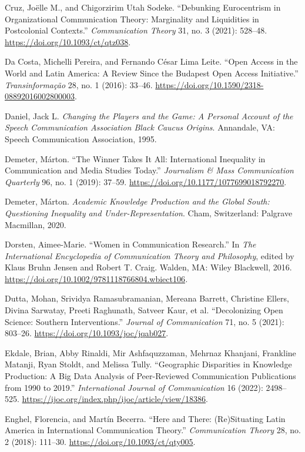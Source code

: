 \documentclass{tufte-handout}
\begin{document}
\begin{hangparas}{.25in}{1}
Cruz, Joëlle M., and Chigorzirim Utah Sodeke. ``Debunking Eurocentrism
in Organizational Communication Theory: Marginality and Liquidities in
Postcolonial Contexts.'' \emph{Communication Theory} 31, no. 3 (2021):
528--48. \url{https://doi.org/10.1093/ct/qtz038}.

Da Costa, Michelli Pereira, and Fernando César Lima Leite. ``Open Access
in the World and Latin America: A Review Since the Budapest Open Access
Initiative.'' \emph{Transinformação} 28, no. 1 (2016): 33--46.
\url{https://doi.org/10.1590/2318-08892016002800003}.

Daniel, Jack L. \emph{Changing the Players and the Game: A Personal
Account of the Speech Communication Association Black Caucus Origins}.
Annandale, VA: Speech Communication Association, 1995.

Demeter, Márton. ``The Winner Takes It All: International Inequality in
Communication and Media Studies Today.'' \emph{Journalism \& Mass
Communication Quarterly} 96, no. 1 (2019): 37--59.
\url{https://doi.org/10.1177/1077699018792270}.

Demeter, Márton. \emph{Academic Knowledge Production and the Global
South: Questioning Inequality and Under-Representation}. Cham,
Switzerland: Palgrave Macmillan, 2020.

Dorsten, Aimee-Marie. ``Women in Communication Research.'' In \emph{The
International Encyclopedia of Communication Theory and Philosophy},
edited by Klaus Bruhn Jensen and Robert T. Craig. Walden, MA: Wiley
Blackwell, 2016.
\url{https://doi.org/10.1002/9781118766804.wbiect106}\emph{.}

Dutta, Mohan, Srividya Ramasubramanian, Mereana Barrett, Christine
Ellers, Divina Sarwatay, Preeti Raghunath, Satveer Kaur, et al.
``Decolonizing Open Science: Southern Interventions.'' \emph{Journal of
Communication} 71, no. 5 (2021): 803--26.
\url{https://doi.org/10.1093/joc/jqab027}.

Ekdale, Brian, Abby Rinaldi, Mir Ashfaquzzaman, Mehrnaz Khanjani,
Frankline Matanji, Ryan Stoldt, and Melissa Tully. ``Geographic
Disparities in Knowledge Production: A Big Data Analysis of
Peer-Reviewed Communication Publications from 1990 to 2019.''
\emph{International Journal of Communication} 16 (2022): 2498--525.
\url{https://ijoc.org/index.php/ijoc/article/view/18386}.

Enghel, Florencia, and Martín Becerra. ``Here and There: (Re)Situating
Latin America in International Communication Theory.''
\emph{Communication Theory} 28, no. 2 (2018): 111--30.
\url{https://doi.org/10.1093/ct/qty005}.


\end{hangparas}
\end{document}
